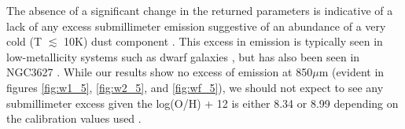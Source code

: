 The absence of a significant change in the returned parameters is indicative of a lack of any excess submillimeter emission suggestive of an abundance of a very cold (T $\lesssim$ 10K) dust component \citep{dale2012}.  This excess in emission is typically seen in low-metallicity systems such as dwarf galaxies \citep{madden2011}, but has also been seen in NGC3627 \citep{galametz2014}.  While our results show no excess of emission at 850$\mu$m (evident in figures \ref{fig:w1_5}, \ref{fig:w2_5}, and \ref{fig:wf_5}), we should not expect to see any submillimeter excess given the log(O/H) + 12 is either 8.34 or 8.99 depending on the calibration values used \citep{moustakas2010}.




